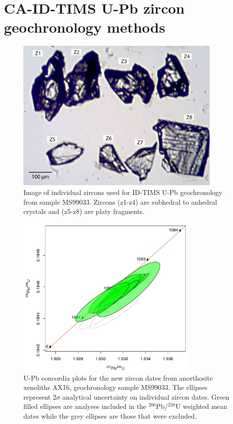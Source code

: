 \section*{CA-ID-TIMS U-Pb zircon geochronology methods}

\begin{figure}[h!]
\noindent\includegraphics[width=0.9\textwidth]{figure/Zhang2021/SI_zircons.pdf}
\centering
\caption[Image of individual zircons used for ID-TIMS U-Pb geochronology from sample MS99033]{\footnotesize{Image of individual zircons used for ID-TIMS U-Pb geochronology from sample MS99033. Zircons (z1-z4) are subhedral to anhedral crystals and (z5-z8) are platy fragments.}}
\label{fig:zircon_image}
\end{figure}

\begin{figure}[h!]
\noindent\includegraphics[width=0.8\textwidth]{figure/Zhang2021/SI_MS99033_geochron_plot.pdf}
\centering
\caption[U-Pb concordia plots for the new zircon dates from anorthosite xenoliths AX16, geochronology sample MS99033]{\footnotesize{U-Pb concordia plots for the new zircon dates from anorthosite xenoliths AX16, geochronology sample MS99033. The ellipses represent 2$\sigma$ analytical uncertainty on individual zircon dates. Green filled ellipses are analyses included in the $^{206}$Pb/$^{238}$U weighted mean dates while the grey ellipses are those that were excluded. }}
\label{fig:zircon_concordia}
\end{figure}

